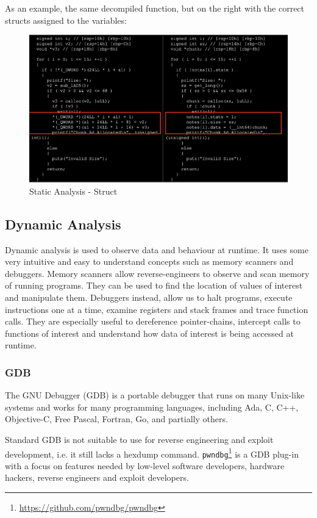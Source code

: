 \documentclass{article}
\begin{document}
As an example, the same decompiled function, but on the right with the correct structs assigned to the variables:
\begin{figure}[H]
\centering
\includegraphics[width=1\textwidth]{img/struct.pdf}
\caption{Static Analysis - Struct}
\label{fig:struct}
\end{figure}

\subsection{Dynamic Analysis} 

Dynamic analysis is used to observe data and behaviour at runtime. It uses some very intuitive and easy to 
understand concepts such as memory scanners and debuggers. Memory scanners allow reverse-engineers to observe 
and scan memory of running programs. They can be used to find the location of values of interest and manipulate them.
Debuggers instead, allow us to halt programs, execute instructions one at a time, examine registers and stack frames 
and trace function calls. They are especially useful to dereference pointer-chains, intercept calls to functions 
of interest and understand how data of interest is being accessed at runtime.

\subsubsection{GDB}

The GNU Debugger (GDB) is a portable debugger that runs on many Unix-like systems and works for many programming 
languages, including Ada, C, C++, Objective-C, Free Pascal, Fortran, Go, and partially others.

Standard GDB is not suitable to use for reverse engineering and exploit development, i.e. it still lacks a hexdump 
command. \texttt{pwndbg}\footnote{\url{https://github.com/pwndbg/pwndbg}} is a GDB plug-in with a focus on features needed by low-level software developers, hardware 
hackers, reverse engineers and exploit developers. 
\end{document}
